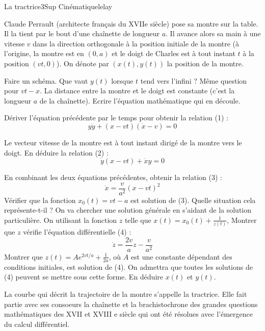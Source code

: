 \begin{exercise}{La tractrice}{3}{Sup}
{Cinématique}{lelay}

Claude Perrault (architecte français du XVIIe siècle) pose sa montre sur la table. Il la tient par le bout d'une chaînette de longueur $a$. Il avance alors sa main à une vitesse $v$ dans la direction orthogonale à la position initiale de la montre (à l'origine, la montre est en $(0,a)$ et le doigt de Charles est à tout instant $t$ à la position $(vt, 0)$). On dénote par $(x(t), y(t))$ la position de la montre.
\begin{questions}
    \question Faire un schéma. Que vaut $y(t)$ lorsque $t$ tend vers l'infini ? Même question pour $vt-x$.
    \question La distance entre la montre et le doigt est constante (c'est la longueur $a$ de la chaînette). Ecrire l'équation mathématique qui en découle.
    
    \question Dériver l'équation précédente par le temps pour obtenir la relation (1) :
    $$ y\dot y  + (x-vt)(\dot x - v) = 0$$
    
    \question Le vecteur vitesse de la montre est à tout instant dirigé de la montre vers le doigt. En déduire la relation (2) :
    $$ \dot y (x- vt) + \dot x y = 0$$
    
    \question En combinant les deux équations précédentes, obtenir la relation (3) :
    $$ \dot x = \frac{v}{a^2}(x-vt)^2$$
    \question Vérifier que la fonction $x_0(t) = vt-a$ est solution de (3). Quelle situation cela représente-t-il ?
    \question On va chercher une solution générale en s'aidant de la solution particulière. On utilisant la fonction $z$ telle que $x(t) = x_0(t) + \frac1{z(t)}$, Montrer que $z$ vérifie l'équation différentielle (4) :
    $$
    \dot z = \frac{2v}{a}z - \frac{v}{a^2}
    $$
    \question Montrer que $z(t) = Ae^{2vt/a} + \frac{1}{2a}$, où $A$ est une constante dépendant des conditions initiales,
    est solution  de (4). On admettra que toutes les solutions de (4) peuvent se mettre sous cette forme.
    \question En déduire $x(t)$ et $y(t)$.
\end{questions}
La courbe qui décrit la trajectoire de la montre s'appelle la tractrice. Elle fait partie avec ses consoeurs la chaînette et la brachistochrone des grandes questions mathématiques des XVII et XVIII e siècle qui ont été résolues avec l'émergence du calcul différentiel.

\end{exercise}

